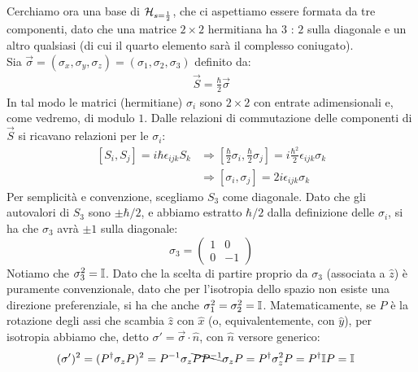 \documentclass[../../FisicaTeorica.tex]{subfiles}
\begin{document}
Cerchiamo ora una base di $\mathcal{H}_{s=\frac{1}{2}}$, che ci aspettiamo essere formata da tre componenti, dato che una matrice $2\times 2$ hermitiana ha $3$ : $2$ sulla diagonale e un altro qualsiasi (di cui il quarto elemento sarà il complesso coniugato).\\
Sia $\vec{\sigma}=(\sigma_x, \sigma_y, \sigma_z)=(\sigma_1, \sigma_2, \sigma_3)$ definito da:
\begin{align*}
\vec{S}=\frac{\hbar}{2}\vec{\sigma}
\end{align*}
In tal modo le matrici (hermitiane) $\sigma_i$ sono $2\times 2$ con entrate adimensionali e, come vedremo, di modulo $1$. Dalle relazioni di commutazione delle componenti di $\vec{S}$ si ricavano relazioni per le $\sigma_i$:
\begin{align}\nonumber
[S_i, S_j] = i\hbar \epsilon_{ijk}S_k &\Rightarrow  \left[\frac{\hbar}{2}\sigma_i, \frac{\hbar}{2}\sigma_j \right] = i\frac{\hbar^2}{2}\epsilon_{ijk}\sigma_k\\
&\Rightarrow [\sigma_i, \sigma_j]=2i\epsilon_{ijk}\sigma_k \label{eqn:commutazione-sigma}
\end{align}
Per semplicità e convenzione, scegliamo $S_3$ come diagonale. Dato che gli autovalori di $S_3$ sono $\pm \hbar/2$, e abbiamo estratto $\hbar/2$ dalla definizione delle $\sigma_i$, si ha che $\sigma_3$ avrà $\pm 1$ sulla diagonale:
\[
\sigma_3 = \begin{pmatrix}
1 & 0\\
0 & -1
\end{pmatrix}
\]
Notiamo che $\sigma_3^2 = \mathbb{I}$. Dato che la scelta di partire proprio da $\sigma_3$ (associata a $\hat{z}$) è puramente convenzionale, dato che per l'isotropia dello spazio non esiste una direzione preferenziale, si ha che anche $\sigma_1^2 = \sigma_2^2 = \mathbb{I}$. Matematicamente, se $P$ è la rotazione degli assi che scambia $\hat{z}$ con $\hat{x}$ (o, equivalentemente, con $\hat{y}$), per isotropia abbiamo che, detto $\sigma' = \vec{\sigma}\cdot \hat{n}$, con $\hat{n}$ versore generico:
\begin{align*}
(\sigma')^2 =(P^\dag \sigma_z P)^2 &= P^{-1}\sigma_z \bcancel{PP^{-1}}\sigma_z P = P^\dag \sigma_z^2 P = P^\dag \mathbb{I}P=\mathbb{I}
\end{align*}
\end{document}
